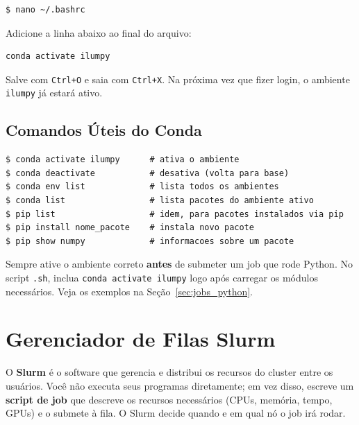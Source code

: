 \documentclass[11pt, a4paper]{article}
\newcommand{\cmd}[1]{\texttt{\textcolor{codeblue}{#1}}}
\begin{document}
\begin{lstlisting}[style=terminal]
$ nano ~/.bashrc
\end{lstlisting}

Adicione a linha abaixo ao final do arquivo:

\begin{lstlisting}[style=terminal]
conda activate ilumpy
\end{lstlisting}

Salve com \texttt{Ctrl+O} e saia com \texttt{Ctrl+X}. Na próxima vez que fizer
login, o ambiente \texttt{ilumpy} já estará ativo.

\subsection{Comandos Úteis do Conda}

\begin{lstlisting}[style=terminal]
$ conda activate ilumpy      # ativa o ambiente
$ conda deactivate           # desativa (volta para base)
$ conda env list             # lista todos os ambientes
$ conda list                 # lista pacotes do ambiente ativo
$ pip list                   # idem, para pacotes instalados via pip
$ pip install nome_pacote    # instala novo pacote
$ pip show numpy             # informacoes sobre um pacote
\end{lstlisting}

\begin{dica}
  Sempre ative o ambiente correto \textbf{antes} de submeter um job que
  rode Python. No script \texttt{.sh}, inclua \cmd{conda activate ilumpy}
  logo após carregar os módulos necessários. Veja os exemplos na
  Seção~\ref{sec:jobs_python}.
\end{dica}

\section{Gerenciador de Filas Slurm}
\label{sec:slurm}

O \textbf{Slurm} é o software que gerencia e distribui os recursos do cluster
entre os usuários. Você não executa seus programas diretamente; em vez disso,
escreve um \textbf{script de job} que descreve os recursos necessários
(CPUs, memória, tempo, GPUs) e o submete à fila. O Slurm decide quando e
em qual nó o job irá rodar.
\end{document}
